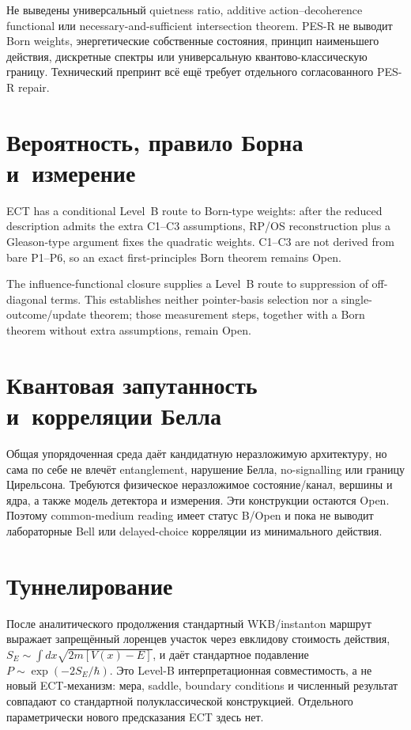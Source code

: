\documentclass[11pt,a4paper]{article}
\begin{document}
Не выведены универсальный quietness ratio, additive action--decoherence
functional или necessary-and-sufficient intersection theorem. PES-R не
выводит Born weights, энергетические собственные состояния, принцип
наименьшего действия, дискретные спектры или универсальную квантово-классическую
границу. Технический препринт всё ещё требует отдельного согласованного PES-R
repair.

\section{Вероятность, правило Борна и~измерение}

ECT has a conditional Level~B route to Born-type weights: after the reduced description admits the extra C1--C3 assumptions, RP/OS reconstruction plus a Gleason-type argument fixes the quadratic weights.  C1--C3 are not derived from bare P1--P6, so an exact first-principles Born theorem remains Open.

The influence-functional closure supplies a Level~B route to suppression of off-diagonal terms.  This establishes neither pointer-basis selection nor a single-outcome/update theorem; those measurement steps, together with a Born theorem without extra assumptions, remain Open.


\section{Квантовая запутанность и~корреляции Белла}
\label{sec:pop_entanglement}

Общая упорядоченная среда даёт кандидатную неразложимую архитектуру, но сама
по себе не влечёт entanglement, нарушение Белла, no-signalling или границу
Цирельсона. Требуются физическое неразложимое состояние/канал, вершины и ядра,
а также модель детектора и измерения. Эти конструкции остаются Open. Поэтому
common-medium reading имеет статус B/Open и пока не выводит лабораторные Bell
или delayed-choice корреляции из минимального действия.

\section{Туннелирование}

После аналитического продолжения стандартный WKB/instanton маршрут выражает
запрещённый лоренцев участок через евклидову стоимость действия,
$S_E\sim\int dx\sqrt{2m[V(x)-E]}$, и даёт стандартное подавление
$P\sim\exp(-2S_E/\hbar)$. Это Level-B интерпретационная совместимость, а не
новый ECT-механизм: мера, saddle, boundary conditions и численный результат
совпадают со стандартной полуклассической конструкцией. Отдельного
параметрически нового предсказания ECT здесь нет.
\end{document}
